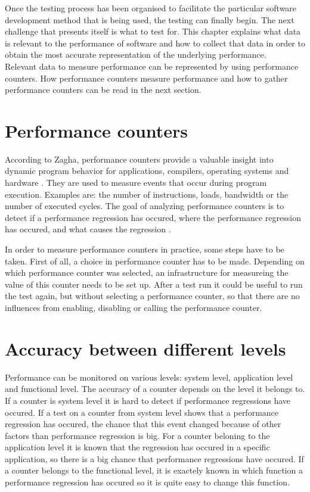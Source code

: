 Once the testing process has been organised to facilitate the particular software development method that is being used, the testing can finally begin. The next challenge that presents itself is what to test for. This chapter explains what data is relevant to the performance of software and how to collect that data in order to obtain the most accurate representation of the underlying performance. \\

Relevant data to measure performance can be represented by using performance counters. How performance counters measure performance and how to gather performance counters can be read in the next section.

\section{Performance counters}
According to Zagha, performance counters provide a valuable insight into dynamic program behavior for applications, compilers, operating systems and hardware \cite{zagha1996performance}. They are used to measure events that occur during program execution. Examples are: the number of instructions, loads, bandwidth or the number of executed cycles. The goal of analyzing performance counters is to detect if a performance regression has occured, where the performance regression has occured, and what causes the regression \cite{nguyen2012using}.

In order to measure performance counters in practice, some steps have to be taken. First of all, a choice in performance counter has to be made. Depending on which performance counter was selected, an infrastructure for measureing the value of this counter needs to be set up. After a test run it could be useful to run the test again, but without selecting a performance counter, so that there are no influences from enabling, disabling or calling the performance counter.

\section{Accuracy between different levels}
Performance can be monitored on various levels: system level, application level and functional level. The accuracy of a counter depends on the level it belongs to. If a counter is system level it is hard to detect if performance regressions have occured. If a test on a counter from system level shows that a performance regression has occured, the chance that this event changed because of other factors than performance regression is big. For a counter beloning to the application level it is known that the regression has occured in a specific application, so there is a big chance that performance regressions have occured. If a counter belongs to the functional level, it is exactely known in which function a performance regression has occured so it is quite easy to change this function.

